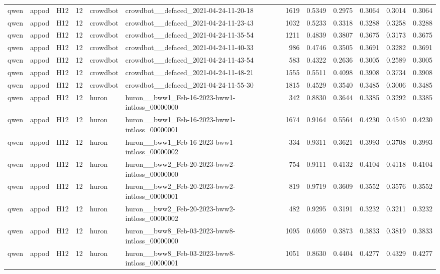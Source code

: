\begin{table}[tbp]
\begin{tabular}{lllrllrrrrrr}
qwen & appod & H12 & 12 & crowdbot & crowdbot\_\_defaced\_2021-04-24-11-20-18 & 1619 & 0.5349 & 0.2975 & 0.3064 & 0.3014 & 0.3064 \\
qwen & appod & H12 & 12 & crowdbot & crowdbot\_\_defaced\_2021-04-24-11-23-43 & 1032 & 0.5233 & 0.3318 & 0.3288 & 0.3258 & 0.3288 \\
qwen & appod & H12 & 12 & crowdbot & crowdbot\_\_defaced\_2021-04-24-11-35-54 & 1211 & 0.4839 & 0.3807 & 0.3675 & 0.3173 & 0.3675 \\
qwen & appod & H12 & 12 & crowdbot & crowdbot\_\_defaced\_2021-04-24-11-40-33 & 986 & 0.4746 & 0.3505 & 0.3691 & 0.3282 & 0.3691 \\
qwen & appod & H12 & 12 & crowdbot & crowdbot\_\_defaced\_2021-04-24-11-43-54 & 583 & 0.4322 & 0.2636 & 0.3005 & 0.2589 & 0.3005 \\
qwen & appod & H12 & 12 & crowdbot & crowdbot\_\_defaced\_2021-04-24-11-48-21 & 1555 & 0.5511 & 0.4098 & 0.3908 & 0.3734 & 0.3908 \\
qwen & appod & H12 & 12 & crowdbot & crowdbot\_\_defaced\_2021-04-24-11-55-30 & 1815 & 0.4529 & 0.3540 & 0.3485 & 0.3006 & 0.3485 \\
qwen & appod & H12 & 12 & huron & huron\_\_bww1\_Feb-16-2023-bww1-intloss\_00000000 & 342 & 0.8830 & 0.3644 & 0.3385 & 0.3292 & 0.3385 \\
qwen & appod & H12 & 12 & huron & huron\_\_bww1\_Feb-16-2023-bww1-intloss\_00000001 & 1674 & 0.9164 & 0.5564 & 0.4230 & 0.4540 & 0.4230 \\
qwen & appod & H12 & 12 & huron & huron\_\_bww1\_Feb-16-2023-bww1-intloss\_00000002 & 334 & 0.9311 & 0.3621 & 0.3993 & 0.3708 & 0.3993 \\
qwen & appod & H12 & 12 & huron & huron\_\_bww2\_Feb-20-2023-bww2-intloss\_00000000 & 754 & 0.9111 & 0.4132 & 0.4104 & 0.4118 & 0.4104 \\
qwen & appod & H12 & 12 & huron & huron\_\_bww2\_Feb-20-2023-bww2-intloss\_00000001 & 819 & 0.9719 & 0.3609 & 0.3552 & 0.3576 & 0.3552 \\
qwen & appod & H12 & 12 & huron & huron\_\_bww2\_Feb-20-2023-bww2-intloss\_00000002 & 482 & 0.9295 & 0.3191 & 0.3232 & 0.3211 & 0.3232 \\
qwen & appod & H12 & 12 & huron & huron\_\_bww8\_Feb-03-2023-bww8-intloss\_00000000 & 1095 & 0.6959 & 0.3873 & 0.3833 & 0.3819 & 0.3833 \\
qwen & appod & H12 & 12 & huron & huron\_\_bww8\_Feb-03-2023-bww8-intloss\_00000001 & 1051 & 0.8630 & 0.4404 & 0.4277 & 0.4329 & 0.4277 \\

\end{tabular}
\end{table}
